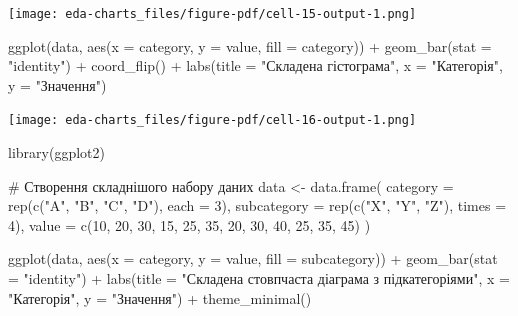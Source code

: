\documentclass[
  letterpaper,
  DIV=11,
  numbers=noendperiod]{scrreprt}
\newenvironment{Shaded}{\begin{snugshade}}{\end{snugshade}}
\newcommand{\AttributeTok}[1]{\textcolor[rgb]{0.40,0.45,0.13}{#1}}
\newcommand{\CommentTok}[1]{\textcolor[rgb]{0.37,0.37,0.37}{#1}}
\newcommand{\DecValTok}[1]{\textcolor[rgb]{0.68,0.00,0.00}{#1}}
\newcommand{\FunctionTok}[1]{\textcolor[rgb]{0.28,0.35,0.67}{#1}}
\newcommand{\NormalTok}[1]{\textcolor[rgb]{0.00,0.23,0.31}{#1}}
\newcommand{\OtherTok}[1]{\textcolor[rgb]{0.00,0.23,0.31}{#1}}
\newcommand{\SpecialCharTok}[1]{\textcolor[rgb]{0.37,0.37,0.37}{#1}}
\newcommand{\StringTok}[1]{\textcolor[rgb]{0.13,0.47,0.30}{#1}}
\begin{document}
\texttt{[image: eda-charts\_files/figure-pdf/cell-15-output-1.png]}

\begin{Shaded}
\begin{Highlighting}[]
\FunctionTok{ggplot}\NormalTok{(data, }\FunctionTok{aes}\NormalTok{(}\AttributeTok{x =}\NormalTok{ category, }\AttributeTok{y =}\NormalTok{ value, }\AttributeTok{fill =}\NormalTok{ category)) }\SpecialCharTok{+}
  \FunctionTok{geom\_bar}\NormalTok{(}\AttributeTok{stat =} \StringTok{"identity"}\NormalTok{) }\SpecialCharTok{+}
  \FunctionTok{coord\_flip}\NormalTok{() }\SpecialCharTok{+}
  \FunctionTok{labs}\NormalTok{(}\AttributeTok{title =} \StringTok{"Складена гістограма"}\NormalTok{, }\AttributeTok{x =} \StringTok{"Категорія"}\NormalTok{, }\AttributeTok{y =} \StringTok{"Значення"}\NormalTok{)}
\end{Highlighting}
\end{Shaded}

\texttt{[image: eda-charts\_files/figure-pdf/cell-16-output-1.png]}

\begin{Shaded}
\begin{Highlighting}[]
\FunctionTok{library}\NormalTok{(ggplot2)}

\CommentTok{\# Створення складнішого набору даних}
\NormalTok{data }\OtherTok{\textless{}{-}} \FunctionTok{data.frame}\NormalTok{(}
  \AttributeTok{category =} \FunctionTok{rep}\NormalTok{(}\FunctionTok{c}\NormalTok{(}\StringTok{"A"}\NormalTok{, }\StringTok{"B"}\NormalTok{, }\StringTok{"C"}\NormalTok{, }\StringTok{"D"}\NormalTok{), }\AttributeTok{each =} \DecValTok{3}\NormalTok{),}
  \AttributeTok{subcategory =} \FunctionTok{rep}\NormalTok{(}\FunctionTok{c}\NormalTok{(}\StringTok{"X"}\NormalTok{, }\StringTok{"Y"}\NormalTok{, }\StringTok{"Z"}\NormalTok{), }\AttributeTok{times =} \DecValTok{4}\NormalTok{),}
  \AttributeTok{value =} \FunctionTok{c}\NormalTok{(}\DecValTok{10}\NormalTok{, }\DecValTok{20}\NormalTok{, }\DecValTok{30}\NormalTok{, }\DecValTok{15}\NormalTok{, }\DecValTok{25}\NormalTok{, }\DecValTok{35}\NormalTok{, }\DecValTok{20}\NormalTok{, }\DecValTok{30}\NormalTok{, }\DecValTok{40}\NormalTok{, }\DecValTok{25}\NormalTok{, }\DecValTok{35}\NormalTok{, }\DecValTok{45}\NormalTok{)}
\NormalTok{)}
\end{Highlighting}
\end{Shaded}

\begin{Shaded}
\begin{Highlighting}[]
\FunctionTok{ggplot}\NormalTok{(data, }\FunctionTok{aes}\NormalTok{(}\AttributeTok{x =}\NormalTok{ category, }\AttributeTok{y =}\NormalTok{ value, }\AttributeTok{fill =}\NormalTok{ subcategory)) }\SpecialCharTok{+}
  \FunctionTok{geom\_bar}\NormalTok{(}\AttributeTok{stat =} \StringTok{"identity"}\NormalTok{) }\SpecialCharTok{+}
  \FunctionTok{labs}\NormalTok{(}\AttributeTok{title =} \StringTok{"Складена стовпчаста діаграма з підкатегоріями"}\NormalTok{, }\AttributeTok{x =} \StringTok{"Категорія"}\NormalTok{, }\AttributeTok{y =} \StringTok{"Значення"}\NormalTok{) }\SpecialCharTok{+}
  \FunctionTok{theme\_minimal}\NormalTok{()}
\end{Highlighting}
\end{Shaded}
\end{document}
